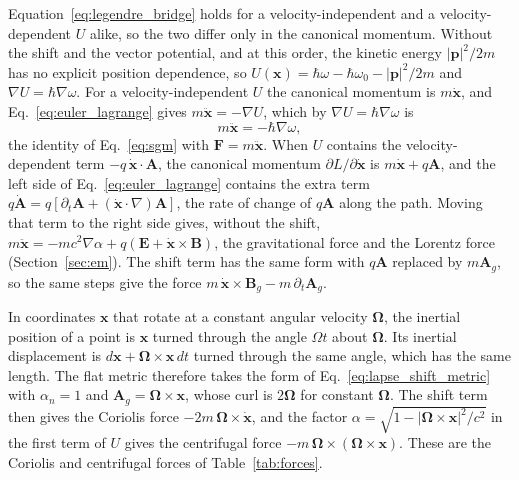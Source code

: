 \documentclass[aps,prd,onecolumn,tightenlines,nofootinbib,notitlepage,11pt,floatfix]{revtex4-2}
\theoremstyle{indentedtheorem}
\begin{document}
Equation~\eqref{eq:legendre_bridge} holds for a velocity-independent and a velocity-dependent $U$ alike, so the two differ only in the canonical momentum. Without the shift and the vector potential, and at this order, the kinetic energy $|\mathbf{p}|^2/2m$ has no explicit position dependence, so $U(\mathbf{x})=\hbar\omega-\hbar\omega_0-|\mathbf{p}|^2/2m$ and $\nabla U=\hbar\nabla\omega$. For a velocity-independent $U$ the canonical momentum is $m\dot{\mathbf{x}}$, and Eq.~\eqref{eq:euler_lagrange} gives $m\ddot{\mathbf{x}}=-\nabla U$, which by $\nabla U=\hbar\nabla\omega$ is
\begin{equation}
    m\ddot{\mathbf{x}} = -\hbar\nabla\omega ,
    \label{eq:el_sgm}
\end{equation}
the identity of Eq.~\eqref{eq:sgm} with $\mathbf{F}=m\ddot{\mathbf{x}}$. When $U$ contains the velocity-dependent term $-q\,\dot{\mathbf{x}}\cdot\mathbf{A}$, the canonical momentum $\partial L/\partial\dot{\mathbf{x}}$ is $m\dot{\mathbf{x}}+q\mathbf{A}$, and the left side of Eq.~\eqref{eq:euler_lagrange} contains the extra term $q\dot{\mathbf{A}}=q[\partial_t\mathbf{A}+(\dot{\mathbf{x}}\cdot\nabla)\mathbf{A}]$, the rate of change of $q\mathbf{A}$ along the path. Moving that term to the right side gives, without the shift, $m\ddot{\mathbf{x}}=-mc^2\nabla\alpha+q(\mathbf{E}+\dot{\mathbf{x}}\times\mathbf{B})$, the gravitational force and the Lorentz force (Section~\ref{sec:em}). The shift term has the same form with $q\mathbf{A}$ replaced by $m\mathbf{A}_g$, so the same steps give the force $m\,\dot{\mathbf{x}}\times\mathbf{B}_g-m\,\partial_t\mathbf{A}_g$.

In coordinates $\mathbf{x}$ that rotate at a constant angular velocity $\boldsymbol{\Omega}$, the inertial position of a point is $\mathbf{x}$ turned through the angle $\Omega t$ about $\boldsymbol{\Omega}$. Its inertial displacement is $d\mathbf{x}+\boldsymbol{\Omega}\times\mathbf{x}\,dt$ turned through the same angle, which has the same length. The flat metric therefore takes the form of Eq.~\eqref{eq:lapse_shift_metric} with $\alpha_n=1$ and $\mathbf{A}_g=\boldsymbol{\Omega}\times\mathbf{x}$, whose curl is $2\boldsymbol{\Omega}$ for constant $\boldsymbol{\Omega}$. The shift term then gives the Coriolis force $-2m\,\boldsymbol{\Omega}\times\dot{\mathbf{x}}$, and the factor $\alpha=\sqrt{1-|\boldsymbol{\Omega}\times\mathbf{x}|^2/c^2}$ in the first term of $U$ gives the centrifugal force $-m\,\boldsymbol{\Omega}\times(\boldsymbol{\Omega}\times\mathbf{x})$. These are the Coriolis and centrifugal forces of Table~\ref{tab:forces}.
\end{document}
